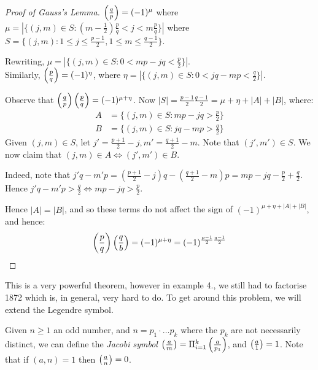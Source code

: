 \documentclass[10pt,a4paper]{article}
\begin{document}
\begin{proof}[Proof of Gauss's Lemma]
$\left(\frac{q}{p}\right)=(-1)^\mu$ where $\mu = |\{(j,m) \in S : (m-\frac{1}{2})\frac{p}{q} < j < m\frac{p}{q}\}|$ where $S = \{(j,m) : 1\leq j\leq \frac{p-1}{2}, 1 \leq m \leq \frac{q-1}{2}\}$.

Rewriting, $\mu = |\{(j,m) \in S : 0 < mp-jq < \frac{p}{2}\}|$.\\
Similarly, $\left(\frac{p}{q}\right) = (-1)^\eta$, where $\eta = |\{(j,m) \in S : 0 < jq - mp < \frac{q}{2}\}|$.

Observe that $\left(\frac{q}{p}\right) \left(\frac{p}{q}\right) = (-1)^{\mu+\eta}$. Now $|S| = \frac{p-1}{2}\frac{q-1}{2} = \mu + \eta + |A| + |B|$, where:
\begin{align*}
A &= \{(j,m)\in S : mp-jq > \frac{p}{2}\}\\
B &= \{(j,m)\in S : jq-mp > \frac{q}{2}\}
\end{align*}
Given $(j,m) \in S$, let $j' = \frac{p+1}{2}-j, m' = \frac{q+1}{2}-m$. Note that $(j',m') \in S$. We now claim that $(j,m) \in A \iff (j', m') \in B$.

Indeed, note that $j'q-m'p = (\frac{p+1}{2}-j)q - (\frac{q+1}{2}-m)p = mp-jq-\frac{p}{2}+\frac{q}{2}$. Hence $j'q-m'p > \frac{q}{2} \iff mp-jq > \frac{p}{2}$.

Hence $|A| = |B|$, and so these terms do not affect the sign of $(-1)^{\mu+\eta + |A|+|B|}$, and hence:
\begin{align*}
\left(\frac{p}{q}\right)\left(\frac{q}{b}\right) = (-1)^{\mu+\eta}=(-1)^{\frac{p-1}{2}\frac{q-1}{2}}
\end{align*}
\end{proof}

This is a very powerful theorem, however in example 4., we still had to factorise 1872 which is, in general, very hard to do. To get around this problem, we will extend the Legendre symbol.

Given $n \geq 1$ an odd number, and $n=p_1 \cdot \ldots p_k$ where the $p_k$ are not necessarily distinct, we can define the \emph{Jacobi symbol} $\left(\frac{a}{m}\right) = \Pi_{i=1}^k \left(\frac{a}{p_1}\right)$, and $\left(\frac{a}{1}\right) = 1$. Note that if $(a,n)=1$ then $\left(\frac{a}{n}\right) = 0$.
\end{document}

